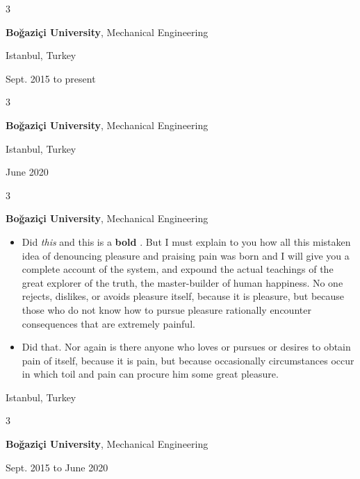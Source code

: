 \documentclass[10pt, letterpaper]{article}
\newenvironment{highlights}{
    \begin{itemize}[
        topsep=0.10 cm,
        parsep=0.10 cm,
        partopsep=0pt,
        itemsep=0pt,
        leftmargin=0.4 cm + 10pt
    ]
}{
    \end{itemize}
} %
\newenvironment{threecolentry}[3][]{
    \onecolentry
    \def\thirdColumn{#3}
    \setcolumnwidth{1 cm, \fill, 4.5 cm}
    \begin{paracol}{3}
    {\raggedright #2} \switchcolumn
}{
    \switchcolumn \raggedleft \thirdColumn
    \end{paracol}
    \endonecolentry
} %
\let\hrefWithoutArrow\href
\renewcommand{\href}[2]{\hrefWithoutArrow{#1}{\mbox{\ifthenelse{\equal{#2}{}}{ }{#2 }\raisebox{.15ex}{\footnotesize \faExternalLink*}}}}
\begin{document}
        \vspace{0.2 cm}

        \begin{threecolentry}{\textbf{}}{
            Istanbul, Turkey

        Sept. 2015 to present
        }
            \textbf{Boğaziçi University}, Mechanical Engineering
        \end{threecolentry}

        \vspace{0.2 cm}

        \begin{threecolentry}{\textbf{}}{
            Istanbul, Turkey

        June 2020
        }
            \textbf{Boğaziçi University}, Mechanical Engineering
        \end{threecolentry}

        \vspace{0.2 cm}

        \begin{threecolentry}{\textbf{}}{
            Istanbul, Turkey
        }
            \textbf{Boğaziçi University}, Mechanical Engineering
            \begin{highlights}
                \item Did \textit{this} and this is a \textbf{bold} \href{https://example.com}{link}. But I must explain to you how all this mistaken idea of denouncing pleasure and praising pain was born and I will give you a complete account of the system, and expound the actual teachings of the great explorer of the truth, the master-builder of human happiness. No one rejects, dislikes, or avoids pleasure itself, because it is pleasure, but because those who do not know how to pursue pleasure rationally encounter consequences that are extremely painful.
                \item Did that. Nor again is there anyone who loves or pursues or desires to obtain pain of itself, because it is pain, but because occasionally circumstances occur in which toil and pain can procure him some great pleasure.
            \end{highlights}
        \end{threecolentry}

        \vspace{0.2 cm}

        \begin{threecolentry}{\textbf{}}{
            Sept. 2015 to June 2020
        }
            \textbf{Boğaziçi University}, Mechanical Engineering
        \end{threecolentry}
\end{document}
